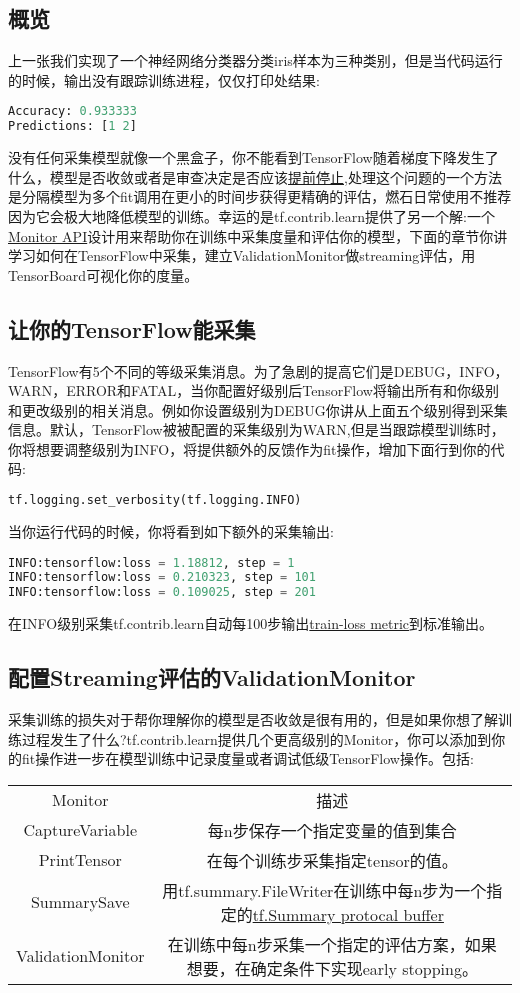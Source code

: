 \subsection{概览}
上一张我们实现了一个神经网络分类器分类iris样本为三种类别，但是当代码运行的时候，输出没有跟踪训练进程，仅仅打印处结果:
\begin{lstlisting}[language=Python]
Accuracy: 0.933333
Predictions: [1 2]
\end{lstlisting}
没有任何采集模型就像一个黑盒子，你不能看到TensorFlow随着梯度下降发生了什么，模型是否收敛或者是审查决定是否应该\href{https://en.wikipedia.org/wiki/Early_stopping}{提前停止},处理这个问题的一个方法是分隔模型为多个fit调用在更小的时间步获得更精确的评估，燃石日常使用不推荐因为它会极大地降低模型的训练。幸运的是tf.contrib.learn提供了另一个解:一个\href{https://www.tensorflow.org/api_docs/python/tf/contrib/learn/monitors}{Monitor API}设计用来帮助你在训练中采集度量和评估你的模型，下面的章节你讲学习如何在TensorFlow中采集，建立ValidationMonitor做streaming评估，用TensorBoard可视化你的度量。
\subsection{让你的TensorFlow能采集}
TensorFlow有5个不同的等级采集消息。为了急剧的提高它们是DEBUG，INFO，WARN，ERROR和FATAL，当你配置好级别后TensorFlow将输出所有和你级别和更改级别的相关消息。例如你设置级别为DEBUG你讲从上面五个级别得到采集信息。默认，TensorFlow被被配置的采集级别为WARN,但是当跟踪模型训练时，你将想要调整级别为INFO，将提供额外的反馈作为fit操作，增加下面行到你的代码:
\begin{lstlisting}[language=Python]
tf.logging.set_verbosity(tf.logging.INFO)
\end{lstlisting}
当你运行代码的时候，你将看到如下额外的采集输出:
\begin{lstlisting}[language=Python]
INFO:tensorflow:loss = 1.18812, step = 1
INFO:tensorflow:loss = 0.210323, step = 101
INFO:tensorflow:loss = 0.109025, step = 201
\end{lstlisting}
在INFO级别采集tf.contrib.learn自动每100步输出\href{}{train-loss metric}到标准输出。
\subsection{配置Streaming评估的ValidationMonitor}
采集训练的损失对于帮你理解你的模型是否收敛是很有用的，但是如果你想了解训练过程发生了什么?tf.contrib.learn提供几个更高级别的Monitor，你可以添加到你的fit操作进一步在模型训练中记录度量或者调试低级TensorFlow操作。包括:
\begin{tabular}{|c|c|}
Monitor&描述\\
CaptureVariable&每n步保存一个指定变量的值到集合\\
PrintTensor&在每个训练步采集指定tensor的值。\\
SummarySave&用tf.summary.FileWriter在训练中每n步为一个指定的\href{https://www.tensorflow.org/api_docs/python/tf/Summary}{tf.Summary protocal buffer}\\
ValidationMonitor&在训练中每n步采集一个指定的评估方案，如果想要，在确定条件下实现early stopping。\\
\end{tabular}
